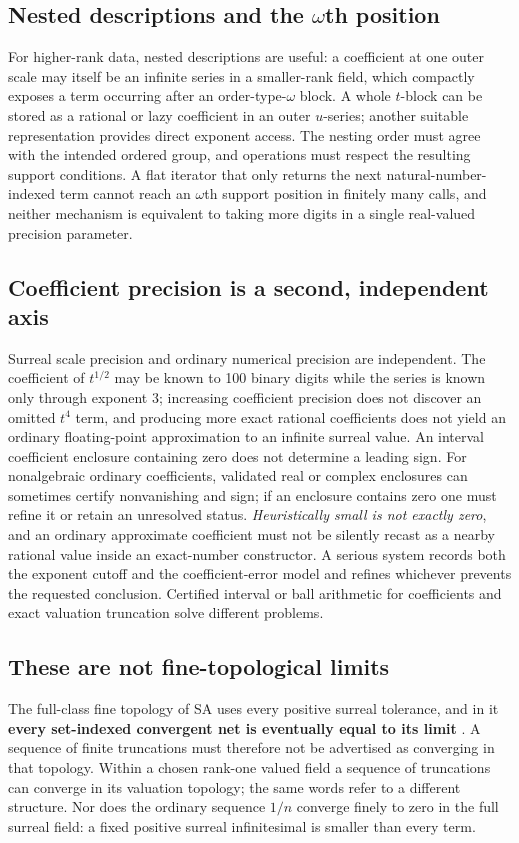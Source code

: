 \documentclass[11pt,letterpaper]{article}
\numberwithin{equation}{section}
\theoremstyle{definition}
\theoremstyle{remark}
\begin{document}
\subsection{Nested descriptions and the \texorpdfstring{$\omega$th}{omega-th} position}
\label{cas:sub-nested}
For higher-rank data, nested descriptions are useful: a coefficient at one outer
scale may itself be an infinite series in a smaller-rank field, which compactly
exposes a term occurring after an order-type-$\omega$ block. A whole $t$-block
can be stored as a rational or lazy coefficient in an outer $u$-series; another
suitable representation provides direct exponent access. The nesting order must
agree with the intended ordered group, and operations must respect the resulting
support conditions. A flat iterator that only returns the next
natural-number-indexed term cannot reach an $\omega$th support position in
finitely many calls, and neither mechanism is equivalent to taking more digits
in a single real-valued precision parameter.

\subsection{Coefficient precision is a second, independent axis}
\label{cas:sub-coeffprecision}
Surreal scale precision and ordinary numerical precision are independent. The
coefficient of $t^{1/2}$ may be known to 100 binary digits while the series is
known only through exponent $3$; increasing coefficient precision does not
discover an omitted $t^4$ term, and producing more exact rational coefficients
does not yield an ordinary floating-point approximation to an infinite surreal
value. An interval coefficient enclosure containing zero does not determine a
leading sign. For nonalgebraic ordinary coefficients, validated real or complex
enclosures can sometimes certify nonvanishing and sign; if an enclosure contains
zero one must refine it or retain an unresolved status. \emph{Heuristically
small is not exactly zero}, and an ordinary approximate coefficient must not be
silently recast as a nearby rational value inside an exact-number constructor.
A serious system records both the exponent cutoff and the coefficient-error
model and refines whichever prevents the requested conclusion. Certified
interval or ball arithmetic for coefficients and exact valuation truncation
solve different problems.

\subsection{These are not fine-topological limits}
\label{cas:sub-finetopology}
The full-class fine topology of SA uses every positive surreal tolerance, and in
it \textbf{every set-indexed convergent net is eventually equal to its limit}
\cite{cas:SourceAnalysisTwo,cas:SourceAnalysisThree}. A sequence of finite
truncations must therefore not be advertised as converging in that topology.
Within a chosen rank-one valued field a sequence of truncations can converge in
its valuation topology; the same words refer to a different structure. Nor does
the ordinary sequence $1/n$ converge finely to zero in the full surreal field: a
fixed positive surreal infinitesimal is smaller than every term.
\end{document}
